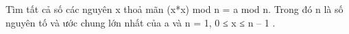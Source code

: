 Tìm tất cả số các nguyên x thoả mãn (x*x) mod n = a mod n. Trong đó n là số nguyên tố và ước chung lớn nhất của a và n = 1, 0 ≤ x ≤ n – 1 .
